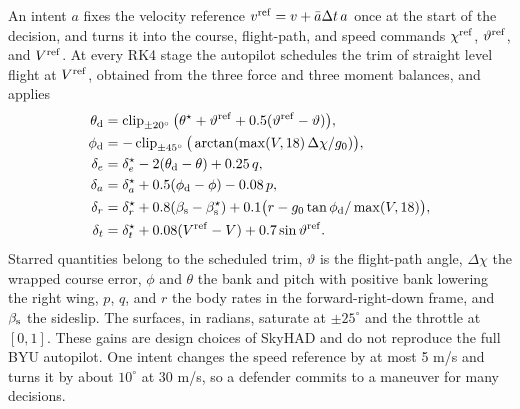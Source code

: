 An intent $a$ fixes the velocity reference $v^{\rm ref}=v+\bar a\Delta t\,a$ once at the start of the decision, and  turns it into the course, flight-path, and speed commands $\chi^{\rm ref}$, $\vartheta^{\rm ref}$, and $V^{\rm ref}$. At every RK4 stage the autopilot schedules the trim of straight level flight at $V^{\rm ref}$, obtained from the three force and three moment balances, and applies
\begin{align}
\theta_{\rm d}&=\operatorname{clip}_{\pm20^\circ}\big(\theta^\star+\vartheta^{\rm ref}+0.5(\vartheta^{\rm ref}-\vartheta)\big),\nonumber\\
\phi_{\rm d}&=-\operatorname{clip}_{\pm45^\circ}\big(\arctan(\max(V,18)\,\Delta\chi/g_0)\big),\nonumber\\
\delta_e&=\delta_e^\star-2(\theta_{\rm d}-\theta)+0.25\,q,\nonumber\\
\delta_a&=\delta_a^\star+0.5(\phi_{\rm d}-\phi)-0.08\,p,\nonumber\\
\delta_r&=\delta_r^\star+0.8(\beta_{\rm s}-\beta_{\rm s}^\star)+0.1\big(r-g_0\tan\phi_{\rm d}/\max(V,18)\big),\nonumber\\
\delta_t&=\delta_t^\star+0.08(V^{\rm ref}-V)+0.7\sin\vartheta^{\rm ref}.
\label{eq:s-autopilot}
\end{align}
Starred quantities belong to the scheduled trim, $\vartheta$ is the flight-path angle, $\Delta\chi$ the wrapped course error, $\phi$ and $\theta$ the bank and pitch with positive bank lowering the right wing, $p$, $q$, and $r$ the body rates in the forward-right-down frame, and $\beta_{\rm s}$ the sideslip. The surfaces, in radians, saturate at $\pm25^\circ$ and the throttle at $[0,1]$. These gains are design choices of SkyHAD and do not reproduce the full BYU autopilot. One intent changes the speed reference by at most 5 m/s and turns it by about $10^\circ$ at 30 m/s, so a defender commits to a maneuver for many decisions.


